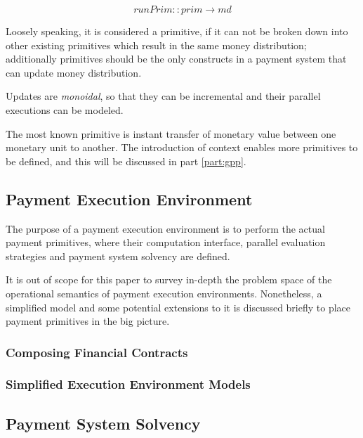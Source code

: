 \begin{equation}
    runPrim :: prim \rightarrow md
\end{equation}

Loosely speaking, it is considered a primitive, if it can not be broken down into other existing
primitives which result in the same money distribution; additionally primitives should be the only
constructs in a payment system that can update money distribution.

Updates are \textit{monoidal}, so that they can be incremental and their parallel executions can be
modeled.

The most known primitive is instant transfer of monetary value between one monetary unit to
another. The introduction of context enables more primitives to be defined, and this will be
discussed in part \ref{part:gpp}.

\subsection{Payment Execution Environment}

The purpose of a payment execution environment is to perform the actual payment primitives, where
their computation interface, parallel evaluation strategies and payment system solvency are defined.

It is out of scope for this paper to survey in-depth the problem space of the operational semantics
of payment execution environments. Nonetheless, a simplified model and some potential extensions to
it is discussed briefly to place payment primitives in the big picture.

\subsubsection{Composing Financial Contracts}



\subsubsection{Simplified Execution Environment Models}



\subsection{Payment System Solvency}


